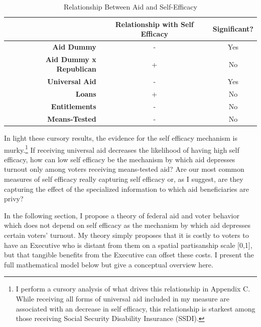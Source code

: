 \documentclass[12pt]{paper}
\begin{document}
\begin{table}[H]
	\centering
	\begin{adjustbox}{width=0.8\textwidth}
\begin{tabular}{rcc}
	\multicolumn{1}{c}{\textbf{}}                         & \textbf{Relationship with Self Efficacy} & \textbf{Significant?}    \\ \hline
	\multicolumn{1}{|r|}{\textbf{Aid Dummy}}              & \multicolumn{1}{c|}{-}                   & \multicolumn{1}{c|}{Yes} \\ \hline
	\multicolumn{1}{|r|}{\textbf{Aid Dummy x Republican}} & \multicolumn{1}{c|}{+}                   & \multicolumn{1}{c|}{No}  \\ \hline
	\multicolumn{1}{|r|}{\textbf{Universal Aid}}          & \multicolumn{1}{c|}{-}                   & \multicolumn{1}{c|}{Yes} \\ \hline
	\multicolumn{1}{|r|}{\textbf{Loans}}                  & \multicolumn{1}{c|}{+}                   & \multicolumn{1}{c|}{No}  \\ \hline
	\multicolumn{1}{|r|}{\textbf{Entitlements}}           & \multicolumn{1}{c|}{-}                   & \multicolumn{1}{c|}{No}  \\ \hline
	\multicolumn{1}{|r|}{\textbf{Means-Tested}}           & \multicolumn{1}{c|}{-}                   & \multicolumn{1}{c|}{No}  \\ \hline
		\end{tabular}
\end{adjustbox}
\caption{Relationship Between Aid and Self-Efficacy} 
\label{}
\end{table}

In light these cursory results, the evidence for the self efficacy mechanism is murky.\footnote{I perform a cursory analysis of what drives this relationship in Appendix C. While receiving all forms of universal aid included in my measure are associated with an decrease in self efficacy, this relationship is starkest among those receiving Social Security Disability Insurance (SSDI).} If receiving universal aid decreases the likelihood of having high self efficacy, how can low self efficacy be the mechanism by which aid depresses turnout only among voters receiving means-tested aid? Are our most common measures of self efficacy really capturing self efficacy or, as I suggest, are they capturing the effect of the specialized information to which aid beneficiaries are privy?

In the following section, I propose a theory of federal aid and voter behavior which does not depend on self efficacy as the mechanism by which aid depresses certain voters' turnout. My theory simply proposes that it is costly to voters to have an Executive who is distant from them on a spatial partisanship scale [0,1], but that tangible benefits from the Executive can offset these costs. I present the full mathematical model below but give a conceptual overview here. 
\end{document}
